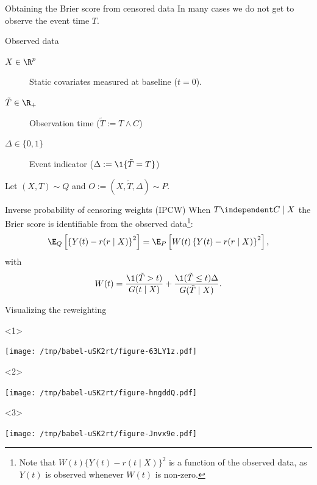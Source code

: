 \documentclass[handout]{beamer}\usepackage{listings}
\begin{document}
\begin{frame}[label={sec:org3a8d8e9}]{Obtaining the Brier score from censored data}
In many cases we do not get to observe the event time \(T\). \pause

\begin{block}{Observed data}
\begin{description}
\item[{\(X \in \R^p\)}] Static covariates measured at baseline (\(t=0\)).
\item[{\(\tilde T \in \R_+\)}] Observation time (\(\tilde T := T \wedge C\))
\item[{\(\Delta \in \{0,1\}\)}] Event indicator (\(\Delta := \1\{\tilde T = T\}\))
\end{description}

Let \((X, T) \sim Q\) and \(O := (X, \tilde T, \Delta) \sim P\). \pause
\end{block}

\begin{block}{Inverse probability of censoring weights (IPCW)}
When $T \independent C \mid X$ the Brier score is identifiable from the observed
data\footnote<3->{Note that $W(t)\{Y(t)-r(t\mid X)\}^2$ is a function of the observed data, as
  $Y(t)$ is observed whenever $W(t)$ is non-zero.}:
\begin{equation*}
  \E_Q\left[ 
    \left\{
      Y(t) - r(r \mid X)
    \right\}^2 \right]
  = \E_P\left[
    W(t)
    \left\{
      Y(t) - r(r \mid X)
    \right\}^2 \right],
\end{equation*}
with
\begin{equation*}
  W(t) = \frac{\1({\tilde{T} >t})}{G(t \mid X)} + \frac{\1({\tilde{T}\leq
      t})\Delta}{G(\tilde{T}\mid X)}.
\end{equation*}
\end{block}
\end{frame}


\begin{frame}[label={sec:orgdde99f0}]{Visualizing the reweighting}
\begin{onlyenv}<1>
\begin{center}
\texttt{[image: /tmp/babel-uSK2rt/figure-63LY1z.pdf]}
\end{center}
\end{onlyenv}


\begin{onlyenv}<2>
\begin{center}
\texttt{[image: /tmp/babel-uSK2rt/figure-hngddQ.pdf]}
\end{center}
\end{onlyenv}


\begin{onlyenv}<3>
\begin{center}
\texttt{[image: /tmp/babel-uSK2rt/figure-Jnvx9e.pdf]}
\end{center}
\end{onlyenv}
\end{frame}
\end{document}
